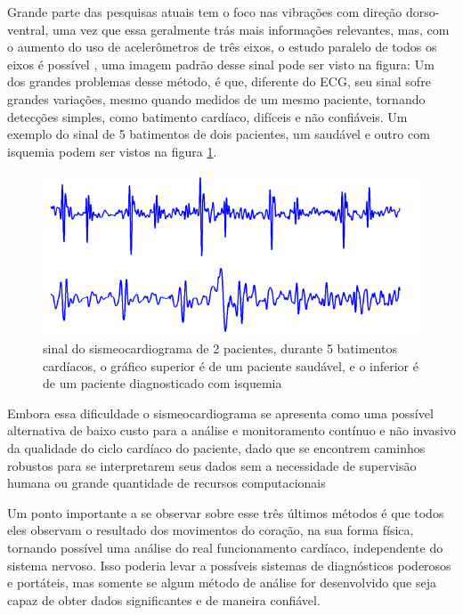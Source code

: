      Grande parte das pesquisas atuais tem o foco nas vibrações com direção dorso-ventral, uma vez que essa geralmente trás mais informações relevantes, mas, com o aumento do uso de acelerômetros de três eixos, o estudo paralelo de todos os eixos é possível \cite{3dPrecordialAccSignal}, uma imagem padrão desse sinal pode ser visto na figura: %
Um dos grandes problemas desse método, é que, diferente do ECG, seu sinal sofre grandes variações, mesmo quando medidos de um mesmo paciente\cite{3dPrecordialAccSignal}\cite{heartbeatSegInSeismocardiograms}\cite{06945019}, tornando detecções simples, como batimento cardíaco, difíceis e não confiáveis. Um exemplo do sinal de 5 batimentos de dois pacientes, um saudável e outro com isquemia podem ser vistos na figura \ref{fig:5bat}. %

\begin{figure}[H]
    \center
    \includegraphics[width=0.4\linewidth]{img/06945019_1.png}
    \caption{sinal do sismeocardiograma de 2 pacientes, durante 5 batimentos cardíacos, o gráfico superior é de um paciente saudável, e o inferior é de um paciente diagnosticado com isquemia}
    \label{fig:5bat}
\end{figure}


    Embora essa dificuldade o sismeocardiograma se apresenta como uma possível alternativa de baixo custo para a análise e monitoramento contínuo e não invasivo da qualidade do ciclo cardíaco do paciente\cite{06611240}, dado que se encontrem caminhos robustos para se interpretarem seus dados sem a necessidade de supervisão humana ou grande quantidade de recursos computacionais

    Um ponto importante a se observar sobre esse três últimos métodos é que todos eles observam o resultado dos movimentos do coração, na sua forma física, tornando possível uma análise do real funcionamento cardíaco, independente do sistema nervoso. Isso poderia levar a possíveis sistemas de diagnósticos poderosos e portáteis, mas somente se algum método de análise for desenvolvido que seja capaz de obter dados significantes e de maneira confiável. 
